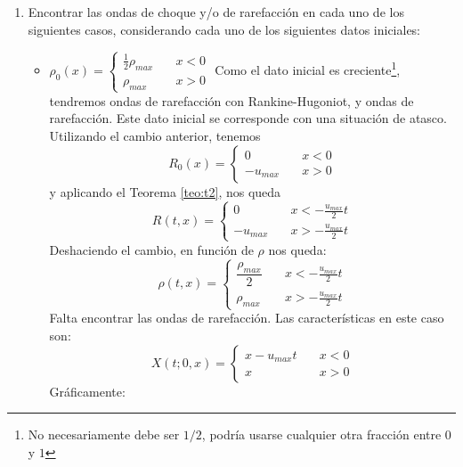 \begin{ejercicio}
\begin{enumerate}
        \item Encontrar las ondas de choque y/o de rarefacción en cada uno de los siguientes casos, considerando cada uno de los siguientes datos iniciales:
        \begin{itemize}
            \item $\rho_0(x) = \begin{cases}
                \frac{1}{2} \rho_{max} \quad& x < 0 \\
                \rho_{max} \quad& x > 0
            \end{cases}$
            Como el dato inicial es creciente\footnote{No necesariamente debe ser $1/2$, podría usarse cualquier otra fracción entre $0$ y $1$}, tendremos ondas de rarefacción con Rankine-Hugoniot, y ondas de rarefacción. Este dato inicial 
            se corresponde con una situación de atasco. \\

            Utilizando el cambio anterior, tenemos 
            $$R_0(x) = \begin{cases}
                0 \quad& x < 0 \\
                -u_{max} \quad& x > 0
            \end{cases}$$
            y aplicando el Teorema \ref{teo:t2}, nos queda 
            $$R(t,x) = \begin{cases}
                0 \quad& x < - \frac{u_{max}}{2} t \\
                -u_{max} \quad& x > - \frac{u_{max}}{2} t
            \end{cases}$$
            Deshaciendo el cambio, en función de $\rho$ nos queda:
            $$\rho(t,x) = \begin{cases}
                \dfrac{\rho_{max}}{2} \quad& x < - \frac{u_{max}}{2} t \\
                \rho_{max} \quad& x > - \frac{u_{max}}{2} t
            \end{cases}$$
            Falta encontrar las ondas de rarefacción. Las características en este caso son:
            $$X(t;0,x) = \begin{cases}
                x - u_{max} t \quad& x < 0 \\
                x \quad& x > 0
            \end{cases}$$
            Gráficamente:
            \begin{figure}[H]
                \begin{center}


\end{center}
\end{figure}
\end{itemize}
\end{enumerate}
\end{ejercicio}
